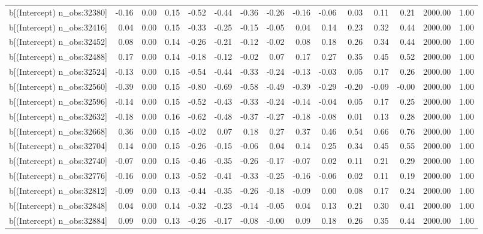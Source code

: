 \begin{table}[ht]
\begin{tabular}{rrrrrrrrrrrrrrr}
  b[(Intercept) n\_obs:32380] & -0.16 & 0.00 & 0.15 & -0.52 & -0.44 & -0.36 & -0.26 & -0.16 & -0.06 & 0.03 & 0.11 & 0.21 & 2000.00 & 1.00 \\ 
  b[(Intercept) n\_obs:32416] & 0.04 & 0.00 & 0.15 & -0.33 & -0.25 & -0.15 & -0.05 & 0.04 & 0.14 & 0.23 & 0.32 & 0.44 & 2000.00 & 1.00 \\ 
  b[(Intercept) n\_obs:32452] & 0.08 & 0.00 & 0.14 & -0.26 & -0.21 & -0.12 & -0.02 & 0.08 & 0.18 & 0.26 & 0.34 & 0.44 & 2000.00 & 1.00 \\ 
  b[(Intercept) n\_obs:32488] & 0.17 & 0.00 & 0.14 & -0.18 & -0.12 & -0.02 & 0.07 & 0.17 & 0.27 & 0.35 & 0.45 & 0.52 & 2000.00 & 1.00 \\ 
  b[(Intercept) n\_obs:32524] & -0.13 & 0.00 & 0.15 & -0.54 & -0.44 & -0.33 & -0.24 & -0.13 & -0.03 & 0.05 & 0.17 & 0.26 & 2000.00 & 1.00 \\ 
  b[(Intercept) n\_obs:32560] & -0.39 & 0.00 & 0.15 & -0.80 & -0.69 & -0.58 & -0.49 & -0.39 & -0.29 & -0.20 & -0.09 & -0.00 & 2000.00 & 1.00 \\ 
  b[(Intercept) n\_obs:32596] & -0.14 & 0.00 & 0.15 & -0.52 & -0.43 & -0.33 & -0.24 & -0.14 & -0.04 & 0.05 & 0.17 & 0.25 & 2000.00 & 1.00 \\ 
  b[(Intercept) n\_obs:32632] & -0.18 & 0.00 & 0.16 & -0.62 & -0.48 & -0.37 & -0.27 & -0.18 & -0.08 & 0.01 & 0.13 & 0.28 & 2000.00 & 1.00 \\ 
  b[(Intercept) n\_obs:32668] & 0.36 & 0.00 & 0.15 & -0.02 & 0.07 & 0.18 & 0.27 & 0.37 & 0.46 & 0.54 & 0.66 & 0.76 & 2000.00 & 1.00 \\ 
  b[(Intercept) n\_obs:32704] & 0.14 & 0.00 & 0.15 & -0.26 & -0.15 & -0.06 & 0.04 & 0.14 & 0.25 & 0.34 & 0.45 & 0.55 & 2000.00 & 1.00 \\ 
  b[(Intercept) n\_obs:32740] & -0.07 & 0.00 & 0.15 & -0.46 & -0.35 & -0.26 & -0.17 & -0.07 & 0.02 & 0.11 & 0.21 & 0.29 & 2000.00 & 1.00 \\ 
  b[(Intercept) n\_obs:32776] & -0.16 & 0.00 & 0.13 & -0.52 & -0.41 & -0.33 & -0.25 & -0.16 & -0.06 & 0.02 & 0.11 & 0.19 & 2000.00 & 1.00 \\ 
  b[(Intercept) n\_obs:32812] & -0.09 & 0.00 & 0.13 & -0.44 & -0.35 & -0.26 & -0.18 & -0.09 & 0.00 & 0.08 & 0.17 & 0.24 & 2000.00 & 1.00 \\ 
  b[(Intercept) n\_obs:32848] & 0.04 & 0.00 & 0.14 & -0.32 & -0.23 & -0.14 & -0.05 & 0.04 & 0.13 & 0.21 & 0.30 & 0.41 & 2000.00 & 1.00 \\ 
  b[(Intercept) n\_obs:32884] & 0.09 & 0.00 & 0.13 & -0.26 & -0.17 & -0.08 & -0.00 & 0.09 & 0.18 & 0.26 & 0.35 & 0.44 & 2000.00 & 1.00 \\ 

\end{tabular}
\end{table}
